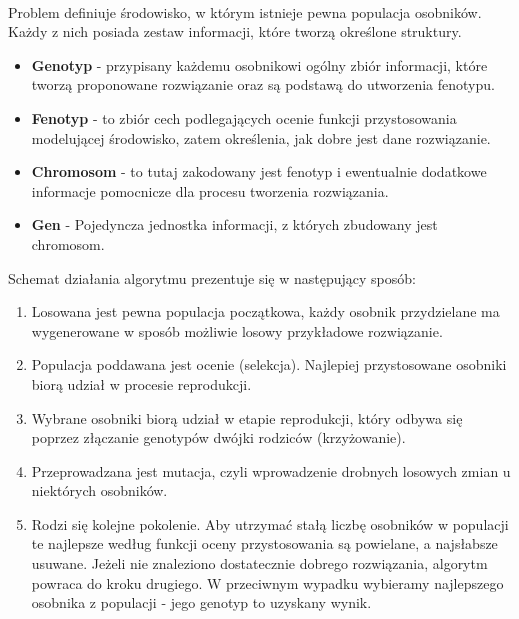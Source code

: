 \paragraph{}Problem definiuje środowisko, w którym istnieje pewna populacja osobników. Każdy z nich posiada zestaw informacji, które tworzą określone struktury.
\begin {itemize}
\item \textbf{Genotyp} - przypisany każdemu osobnikowi ogólny zbiór informacji, które tworzą proponowane rozwiązanie oraz są podstawą do utworzenia fenotypu.
\item \textbf{Fenotyp} - to zbiór cech podlegających ocenie funkcji przystosowania modelującej środowisko, zatem określenia, jak dobre jest dane rozwiązanie.
\item \textbf{Chromosom} - to tutaj zakodowany jest fenotyp i ewentualnie dodatkowe informacje pomocnicze dla procesu tworzenia rozwiązania.
\item \textbf{Gen} - Pojedyncza jednostka informacji, z których zbudowany jest chromosom.
\end{itemize}
\par Schemat działania algorytmu prezentuje się w następujący sposób:
\begin{enumerate}
\item Losowana jest pewna populacja początkowa, każdy osobnik przydzielane ma wygenerowane w sposób możliwie losowy przykładowe rozwiązanie.
\item Populacja poddawana jest ocenie (selekcja). Najlepiej przystosowane osobniki biorą udział w procesie reprodukcji.
\item Wybrane osobniki biorą udział w etapie reprodukcji, który odbywa się poprzez  złączanie genotypów dwójki rodziców (krzyżowanie).
\item Przeprowadzana jest mutacja, czyli wprowadzenie drobnych losowych zmian u niektórych osobników.
\item Rodzi się kolejne pokolenie. Aby utrzymać stałą liczbę osobników w populacji te najlepsze według funkcji oceny przystosowania są powielane, a najsłabsze usuwane. Jeżeli nie znaleziono dostatecznie dobrego rozwiązania, algorytm powraca do kroku drugiego. W przeciwnym wypadku wybieramy najlepszego osobnika z populacji - jego genotyp to uzyskany wynik.
\end{enumerate}
